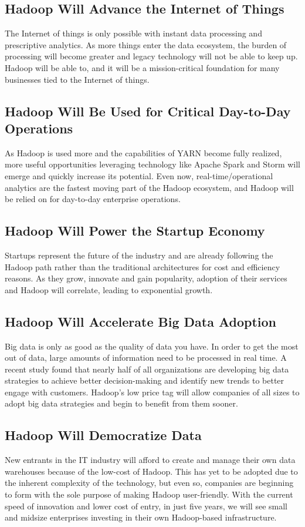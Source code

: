 \documentclass[conference]{IEEEtran}
\begin{document}
\subsection{Hadoop Will Advance the Internet of Things}
The Internet of things is only possible with instant data processing and prescriptive analytics. As more things enter the data ecosystem, the burden of processing will become greater and legacy technology will not be able to keep up. Hadoop will be able to, and it will be a mission-critical foundation for many businesses tied to the Internet of things.

\subsection{Hadoop Will Be Used for Critical Day-to-Day Operations}
As Hadoop is used more and the capabilities of YARN become fully realized, more useful opportunities leveraging technology like Apache Spark and Storm will emerge and quickly increase its potential. Even now, real-time/operational analytics are the fastest moving part of the Hadoop ecosystem, and Hadoop will be relied on for day-to-day enterprise operations.

\subsection{Hadoop Will Power the Startup Economy}
Startups represent the future of the industry and are already following the Hadoop path rather than the traditional architectures for cost and efficiency reasons. As they grow, innovate and gain popularity, adoption of their services and Hadoop will correlate, leading to exponential growth.

\subsection{Hadoop Will Accelerate Big Data Adoption}
Big data is only as good as the quality of data you have. In order to get the most out of data, large amounts of information need to be processed in real time. A recent study found that nearly half of all organizations are developing big data strategies to achieve better decision-making and identify new trends to better engage with customers. Hadoop's low price tag will allow companies of all sizes to adopt big data strategies and begin to benefit from them sooner.

\subsection{Hadoop Will Democratize Data}
New entrants in the IT industry will afford to create and manage their own data warehouses because of the low-cost of Hadoop. This has yet to be adopted due to the inherent complexity of the technology, but even so, companies are beginning to form with the sole purpose of making Hadoop user-friendly. With the current speed of innovation and lower cost of entry, in just five years, we will see small and midsize enterprises investing in their own Hadoop-based infrastructure.
\end{document}
